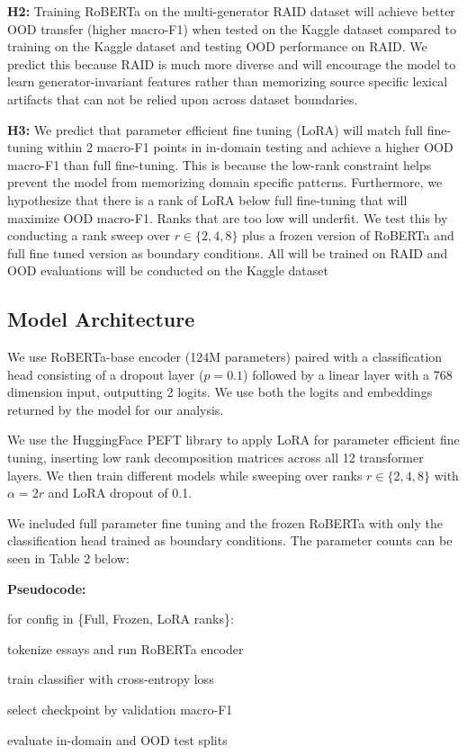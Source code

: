 \documentclass{article}
\begin{document}
\textbf{H2:} Training RoBERTa on the multi-generator RAID dataset will achieve better OOD transfer (higher macro-F1) when tested on the Kaggle dataset compared to training on the Kaggle dataset and testing OOD performance on RAID. We predict this because RAID is much more diverse and will encourage the model to learn generator-invariant features rather than memorizing source specific lexical artifacts that can not be relied upon across dataset boundaries.

\textbf{H3:} We predict that parameter efficient fine tuning (LoRA) will match full fine-tuning within 2 macro-F1 points in in-domain testing and achieve a higher OOD macro-F1 than full fine-tuning. This is because the low-rank constraint helps prevent the model from memorizing domain specific patterns. Furthermore, we hypothesize that there is a rank of LoRA below full fine-tuning that will maximize OOD macro-F1. Ranks that are too low will underfit. We test this by conducting a rank sweep over $r\in \{2,4,8\}$ plus a frozen version of RoBERTa and full fine tuned version as boundary conditions. All will be trained on RAID and OOD evaluations will be conducted on the Kaggle dataset
\subsection{Model Architecture}

We use RoBERTa-base encoder \citep{liu2019roberta} (124M parameters) paired with a classification head consisting of a dropout layer ($p=0.1$) followed by a linear layer with a 768 dimension input, outputting 2 logits. We use both the logits and embeddings returned by the model for our analysis.

We use the HuggingFace PEFT library to apply LoRA \citep{hu2022lora} for parameter efficient fine tuning, inserting low rank decomposition matrices across all 12 transformer layers. We then train different models while sweeping over ranks $r \in \{2, 4, 8\}$ with $\alpha = 2r$ and LoRA dropout of 0.1.

We included full parameter fine tuning and the frozen RoBERTa with only the classification head trained as boundary conditions. The parameter counts can be seen in Table 2 below:

\vspace{-2pt}
\noindent\textbf{Pseudocode:}
{\scriptsize\ttfamily
\par\noindent for config in \{Full, Frozen, LoRA ranks\}:
\par\noindent\hspace*{2em}tokenize essays and run RoBERTa encoder
\par\noindent\hspace*{2em}train classifier with cross-entropy loss
\par\noindent\hspace*{2em}select checkpoint by validation macro-F1
\par\noindent\hspace*{2em}evaluate in-domain and OOD test splits
}
\vspace{-4pt}
\end{document}

